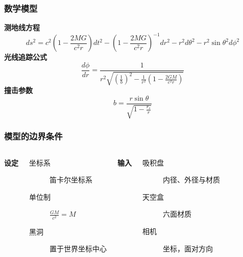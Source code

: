 \documentclass{beamer}
\begin{document}

\begin{frame}
    \frametitle{数学模型}
    \textbf{测地线方程}
    \begin{equation}
        ds^{2}=c^{2}\left(1-\frac{2MG}{c^{2}r}\right)dt^{2}-\left(1-\frac{2MG}{c^{2}r}\right)^{-1}dr^{2}-r^{2}d\theta^{2}-r^{2}\sin\theta^{2}d\phi^{2}
    \end{equation}
    \textbf{光线追踪公式}
    \begin{equation}
        \frac{d\phi}{dr}=\frac{1}{r^{2}\sqrt{\left(\frac{1}{b}\right)^{2}-\frac{1}{r^{2}}\left(1-\frac{2GM}{c^{2}r}\right)}}\label{eq:geodesic}
    \end{equation}
    \textbf{撞击参数}
    \begin{equation}
        b=\frac{r\sin\theta}{\sqrt{1-\frac{r_{s}}{r}}}
    \end{equation}
\end{frame}


\begin{frame}
    \frametitle{模型的边界条件}
    \begin{columns}[c] %

        \textbf{设定}
        \begin{description}
            \item[坐标系] 笛卡尔坐标系
            \item[单位制] $\frac{GM}{c^2}=M$
            \item[黑洞] 置于世界坐标中心
        \end{description}


        \textbf{输入}
        \begin{description}
            \item[吸积盘] 内径、外径与材质
            \item[天空盒] 六面材质
            \item[相机] 坐标，面对方向
        \end{description}

    \end{columns}
\end{frame}
\end{document}

